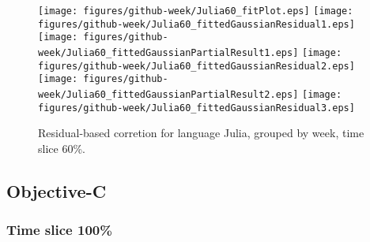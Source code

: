 \begin{figure}[hb]
\centering
{}
{\texttt{[image: figures/github-week/Julia60\_fitPlot.eps]}}
{\texttt{[image: figures/github-week/Julia60\_fittedGaussianResidual1.eps]}}
{\texttt{[image: figures/github-week/Julia60\_fittedGaussianPartialResult1.eps]}}
{\texttt{[image: figures/github-week/Julia60\_fittedGaussianResidual2.eps]}}
{\texttt{[image: figures/github-week/Julia60\_fittedGaussianPartialResult2.eps]}}
{\texttt{[image: figures/github-week/Julia60\_fittedGaussianResidual3.eps]}}
\caption{Residual-based corretion for language Julia, grouped by week, time slice 60\%.}
\end{figure}


\clearpage 
\newpage 


\subsection{Objective-C}

\FloatBarrier

\subsubsection{Time slice 100\%}

